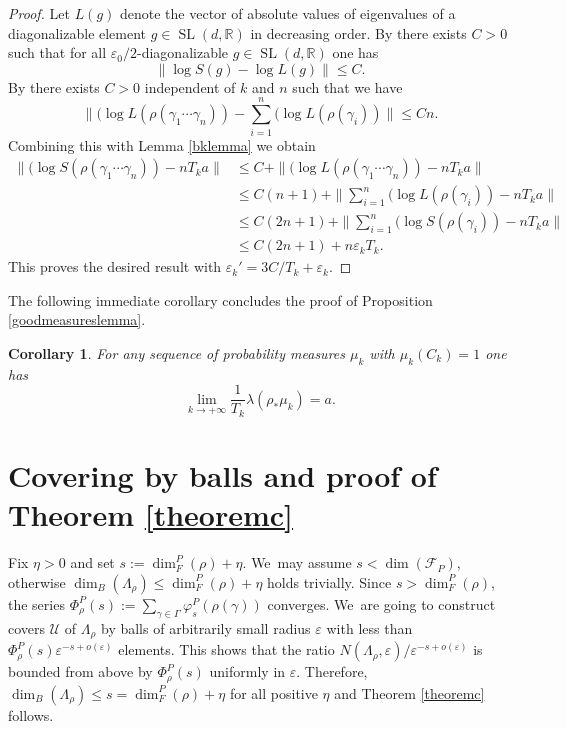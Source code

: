 \documentclass[10pt]{amsart}
\let\ts\textstyle
\let\epsilon\varepsilon
\newtheorem{corollary}[theorem]{Corollary}
\newcommand{\R}{\mathbb{R}}
\newcommand{\F}{\mathcal{F}}
\newcommand{\U}{\mathcal U}
\let\e\varepsilon
\let\La\Lambda
\DeclareMathOperator{\SL}{SL}
\begin{document}
\begin{proof}
Let \(L(g)\) denote the vector of absolute values of eigenvalues of a diagonalizable element \(g \in \SL(d,\R)\) in decreasing order.
By \cite[Lem.\,2.16]{2021breuillard-sert} there exists \(C > 0\) such that for all \(\e_0/2\)-diagonalizable \(g \in \SL(d,\R)\) one has
\[
\|\log S(g) - \log L(g)\| \le C.
\]
By \cite[Prop.\,2.17]{2021breuillard-sert} there exists \(C > 0\) independent of \(k\) and \(n\) such that we have
\[
\|\ts (\log L(\rho(\gamma_1\cdots \gamma_n)) - \sum_{i = 1}^n (\log L (\rho(\gamma_i))\| \le Cn.
\]
Combining this with Lemma \ref{bklemma} we obtain
\begin{align*}\|(\log S(\rho(\gamma_1 \cdots \gamma_n)) - n T_k a\| &\le C + \|(\log L (\rho(\gamma_1\cdots \gamma_n))- nT_k a\|
\\ &\ts\le C(n+1) + \|\sum_{i = 1}^n(\log L (\rho(\gamma_i)) - nT_k a\|
\\ &\ts\le C(2n+1) + \|\sum_{i = 1}^n(\log S (\rho(\gamma_i))- nT_k a\|
\\ &\le C(2n+1) + n \epsilon_k T_k.
\end{align*}
This proves the desired result with \(\epsilon_k' = 3C / T_k + \epsilon_k\).
\end{proof}

The following immediate corollary concludes the proof of Proposition \ref{goodmeasureslemma}.

\begin{corollary}
For any sequence of probability measures \(\mu_k\) with \(\mu_k(C_k) = 1\) one has
\[
\lim_{k \to +\infty}\frac{1}{T_k}\lambda(\rho_*\mu_k) = a.
\]
\end{corollary}

\section{Covering by balls and proof of Theorem \ref{theoremc}}\label{prooftheoremc}

Fix \(\eta >0\) and set \(s:= \dim_F^P(\rho) + \eta \). We~may assume \(s <\dim (\F_{P}) \), otherwise \(\dim_B (\La_\rho) \leq \dim_F^P(\rho) + \eta \) holds trivially. Since \(s > \dim_F^P(\rho)\), the series
\(\Phi^P_\rho (s) := \sum_{\gamma \in \Gamma}\varphi_s^P(\rho(\gamma))\) converges. We~are going to construct covers \(\U\) of \(\La_\rho \) by balls of arbitrarily small radius \(\e\) with less than \(\Phi^P_\rho(s) \e^{-s+o(\e)}\) elements. This shows that the ratio \(N(\La_\rho, \e)/\e^{-s +o(\e)} \) is bounded from above by \(\Phi^P_\rho (s) \) uniformly in \(\e\). Therefore, \(\dim_B (\La_\rho) \leq s =\dim_F^P (\rho)+\eta\) for all positive \(\eta \) and Theorem \ref{theoremc} follows.
\end{document}
